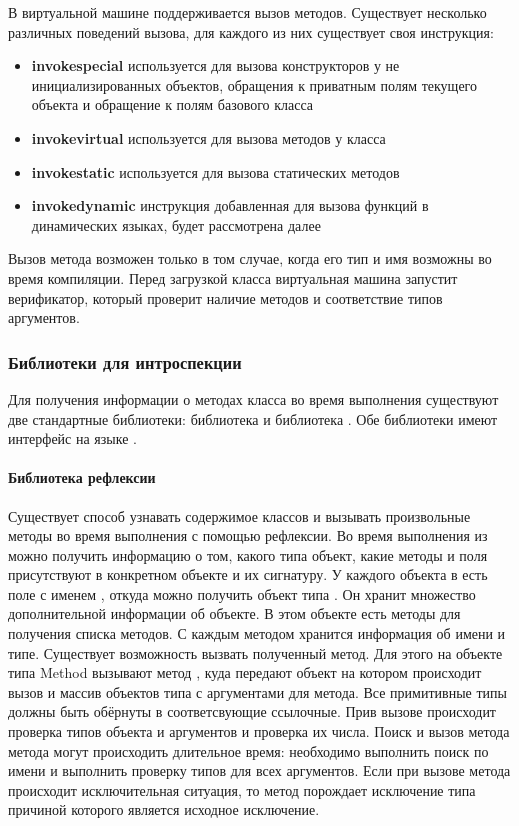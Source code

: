 В виртуальной машине поддерживается вызов методов. Существует несколько различных поведений вызова, для каждого из них существует своя инструкция:
\begin{itemize}
    \item \textbf{invokespecial} используется для вызова конструкторов у не инициализированных объектов, обращения к приватным полям текущего объекта и обращение к полям базового класса
    \item \textbf{invokevirtual} используется для вызова методов у класса
    \item \textbf{invokestatic} используется для вызова статических методов
    \item \textbf{invokedynamic} инструкция добавленная для вызова функций в динамических языках, будет рассмотрена далее
\end{itemize}

Вызов метода возможен только в том случае, когда его тип и имя возможны во время компиляции. Перед загрузкой класса виртуальная машина запустит верификатор, который проверит наличие методов и соответствие типов аргументов.

\subsubsection{Библиотеки для интроспекции}
Для получения информации о методах класса во время выполнения существуют две стандартные библиотеки: библиотека  и библиотека . Обе библиотеки имеют интерфейс на языке .

\paragraph{Библиотека рефлексии}
Существует способ узнавать содержимое классов и вызывать произвольные методы во время выполнения с помощью рефлексии\cite{jvm:reflection}. Во время выполнения из  можно получить информацию о том, какого типа объект, какие методы и поля присутствуют в конкретном объекте и их сигнатуру. У каждого объекта в  есть поле с именем , откуда можно получить объект типа . Он хранит множество дополнительной информации об объекте. В этом объекте есть методы для получения списка методов. С каждым методом хранится информация об имени и типе. Существует возможность вызвать полученный метод. Для этого на объекте типа Method вызывают метод , куда передают объект на котором происходит вызов и массив объектов типа  с аргументами для метода. Все примитивные типы должны быть обёрнуты в соответсвующие ссылочные. Прив вызове происходит проверка типов объекта и аргументов и проверка их числа. Поиск и вызов метода метода могут происходить длительное время: необходимо выполнить поиск по имени и выполнить проверку типов для всех аргументов. Если при вызове метода происходит исключительная ситуация, то метод порождает исключение типа  причиной которого является исходное исключение.

